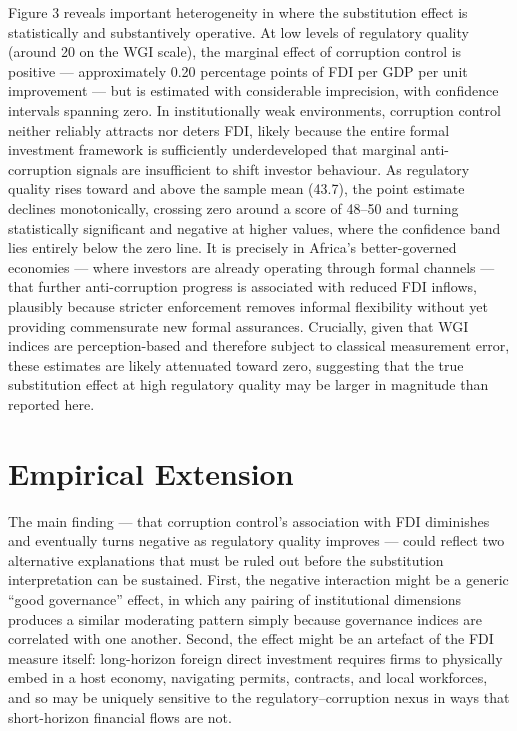 \documentclass[
  12pt,
  letterpaper,
  DIV=11,
  numbers=noendperiod]{scrartcl}
\begin{document}
Figure 3 reveals important heterogeneity in where the substitution
effect is statistically and substantively operative. At low levels of
regulatory quality (around 20 on the WGI scale), the marginal effect of
corruption control is positive --- approximately 0.20 percentage points
of FDI per GDP per unit improvement --- but is estimated with
considerable imprecision, with confidence intervals spanning zero. In
institutionally weak environments, corruption control neither reliably
attracts nor deters FDI, likely because the entire formal investment
framework is sufficiently underdeveloped that marginal anti-corruption
signals are insufficient to shift investor behaviour. As regulatory
quality rises toward and above the sample mean (43.7), the point
estimate declines monotonically, crossing zero around a score of 48--50
and turning statistically significant and negative at higher values,
where the confidence band lies entirely below the zero line. It is
precisely in Africa's better-governed economies --- where investors are
already operating through formal channels --- that further
anti-corruption progress is associated with reduced FDI inflows,
plausibly because stricter enforcement removes informal flexibility
without yet providing commensurate new formal assurances. Crucially,
given that WGI indices are perception-based and therefore subject to
classical measurement error, these estimates are likely attenuated
toward zero, suggesting that the true substitution effect at high
regulatory quality may be larger in magnitude than reported here.

\section{Empirical Extension}\label{empirical-extension}

The main finding --- that corruption control's association with FDI
diminishes and eventually turns negative as regulatory quality improves
--- could reflect two alternative explanations that must be ruled out
before the substitution interpretation can be sustained. First, the
negative interaction might be a generic ``good governance'' effect, in
which any pairing of institutional dimensions produces a similar
moderating pattern simply because governance indices are correlated with
one another. Second, the effect might be an artefact of the FDI measure
itself: long-horizon foreign direct investment requires firms to
physically embed in a host economy, navigating permits, contracts, and
local workforces, and so may be uniquely sensitive to the
regulatory--corruption nexus in ways that short-horizon financial flows
are not.
\end{document}
